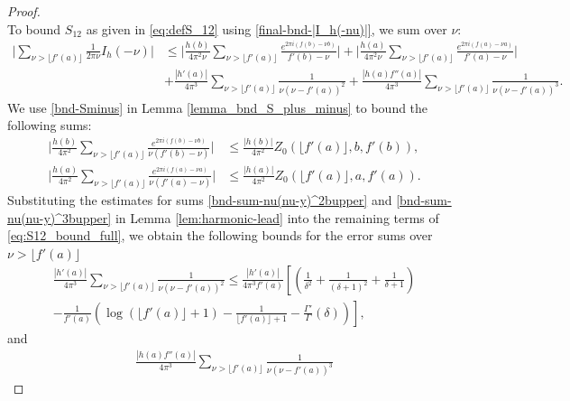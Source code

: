 \documentclass[11pt,letterpaper,oneside,reqno]{amsart}
\renewcommand{\^}[1]{\widehat{#1}}
\numberwithin{equation}{section}
\theoremstyle{remark}
\begin{document}
\begin{proof}
\begin{equation}
\end{equation}
To bound $S_{12}$ as given in \eqref{eq:defS_12} using \eqref{final-bnd-|I_h(-nu)|}, we sum over $\nu$:
\begin{equation}
\begin{aligned}
\bigg| \sum_{\nu > \lfloor f'(a) \rfloor} \frac{1}{2 \pi \nu} I_h(-\nu)\bigg|  
&\le\bigg|  \frac{h(b) }{4 \pi^2 \nu} \sum_{\nu > \lfloor f'(a) \rfloor}  \frac{e^{2 \pi i (f(b) - \nu b)}}{f'(b) - \nu} \bigg| +\bigg| \frac{h(a) }{4 \pi^2 \nu} \sum_{\nu > \lfloor f'(a) \rfloor}\frac{ e^{2 \pi i (f(a) - \nu a)}}{f'(a) - \nu} \bigg|  \\
& + \frac{|h'(a)|}{4 \pi^3} \sum_{\nu > \lfloor f'(a) \rfloor} \frac{1}{\nu (\nu - f'(a))^2}+ \frac{|h(a) f''(a)|}{4 \pi^3} \sum_{\nu > \lfloor f'(a) \rfloor} \frac{1}{\nu (\nu - f'(a))^3}.
\end{aligned} \label{eq:S12_bound_full}
\end{equation}
We use \eqref{bnd-Sminus} in Lemma \ref{lemma_bnd_S_plus_minus} to bound the following sums:
\begin{align}
\bigg|  \frac{h(b)}{4\pi^2} \sum_{\nu > \lfloor f'(a) \rfloor} \frac{e^{2\pi i (f(b)-\nu b)}}{\nu(f'(b)-\nu)} \bigg|  & \leq \frac{|h(b)|}{4\pi^2 } Z_0( \lfloor f'(a)\rfloor, b, f'(b)) , \label{bnd_sum_h(b)_f(b)} \\
\bigg|  \frac{h(a)}{4\pi^2} \sum_{\nu > \lfloor f'(a) \rfloor} \frac{e^{2\pi i (f(a)-\nu a)}}{\nu(f'(a)-\nu)} \bigg|  
&\leq \frac{|h(a)|}{4\pi^2} Z_0(\lfloor f'(a) \rfloor, a, f'(a)). \label{bnd_sum_h(a)_f(a)}
\end{align}
%
Substituting the estimates for sums \eqref{bnd-sum-nu(nu-y)^2bupper} and \eqref{bnd-sum-nu(nu-y)^3bupper} in Lemma \ref{lem:harmonic-lead} into the remaining terms of \eqref{eq:S12_bound_full}, we obtain the following bounds for the error sums over $\nu > \lfloor f'(a) \rfloor$
\begin{multline}
  \frac{|h'(a)|}{4\pi^3 }\sum_{ \nu  > \lfloor f'(a) \rfloor} \frac{1}{\nu(\nu-f'(a))^2} 
\le
  \frac{|h'(a)|}{4\pi^3 f'(a)}  \left[ \left(\frac1{\delta^2}+\frac1{(\delta+1)^2}+ \frac1{\delta+1}  \right)\right. \\
   \left. -\frac1{f'(a) }  \left( \log(\lfloor f'(a) \rfloor+1)-\frac1{\lfloor f'(a) \rfloor+1} - \frac{\Gamma'}{\Gamma}(\delta)\right)\right], \label{error_sum_(nu-f'(a))^2}
\end{multline}
and
\begin{multline}
  \frac{|h(a)f''(a)|}{4\pi^3 }\sum_{ \nu  > \lfloor f'(a) \rfloor} \frac{1}{\nu(\nu-f'(a))^3} 

\end{multline}
\end{proof}
\end{document}

